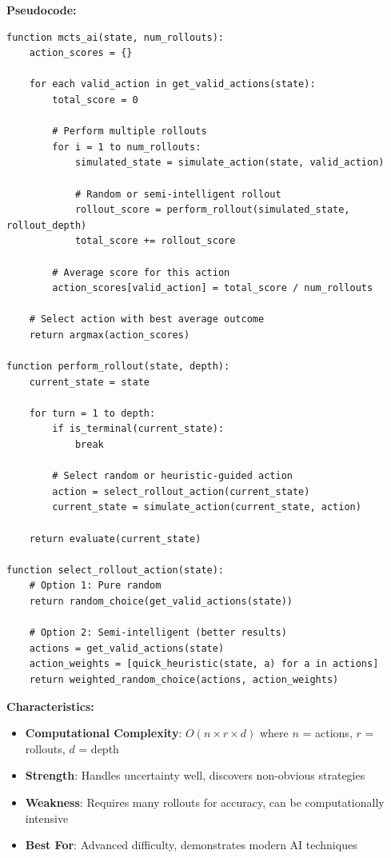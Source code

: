 \documentclass[12pt,a4paper]{article}
\begin{document}
\textbf{Pseudocode:}
\begin{lstlisting}
function mcts_ai(state, num_rollouts):
    action_scores = {}
    
    for each valid_action in get_valid_actions(state):
        total_score = 0
        
        # Perform multiple rollouts
        for i = 1 to num_rollouts:
            simulated_state = simulate_action(state, valid_action)
            
            # Random or semi-intelligent rollout
            rollout_score = perform_rollout(simulated_state, rollout_depth)
            total_score += rollout_score
        
        # Average score for this action
        action_scores[valid_action] = total_score / num_rollouts
    
    # Select action with best average outcome
    return argmax(action_scores)

function perform_rollout(state, depth):
    current_state = state
    
    for turn = 1 to depth:
        if is_terminal(current_state):
            break
        
        # Select random or heuristic-guided action
        action = select_rollout_action(current_state)
        current_state = simulate_action(current_state, action)
    
    return evaluate(current_state)

function select_rollout_action(state):
    # Option 1: Pure random
    return random_choice(get_valid_actions(state))
    
    # Option 2: Semi-intelligent (better results)
    actions = get_valid_actions(state)
    action_weights = [quick_heuristic(state, a) for a in actions]
    return weighted_random_choice(actions, action_weights)
\end{lstlisting}

\textbf{Characteristics:}
\begin{itemize}
    \item \textbf{Computational Complexity}: $O(n \times r \times d)$ where $n$ = actions, $r$ = rollouts, $d$ = depth
    \item \textbf{Strength}: Handles uncertainty well, discovers non-obvious strategies
    \item \textbf{Weakness}: Requires many rollouts for accuracy, can be computationally intensive
    \item \textbf{Best For}: Advanced difficulty, demonstrates modern AI techniques
\end{itemize}
\end{document}
